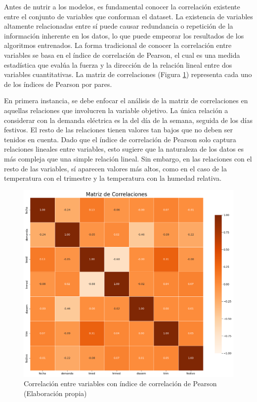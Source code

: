 \documentclass[12pt,a4paper]{report}
\begin{document}
Antes de nutrir a los modelos, es fundamental conocer la correlación existente entre el conjunto de variables que conforman el dataset. La existencia de variables altamente relacionadas entre sí puede causar redundancia o repetición de la información inherente en los datos, lo que puede empeorar los resultados de los algoritmos entrenados. La forma tradicional de conocer la correlación entre variables se basa en el índice de correlación de Pearson, el cual es una medida estadística que evalúa la fuerza y la dirección de la relación lineal entre dos variables cuantitativas. La matriz de correlaciones (Figura \ref{fig:mat_corr}) representa cada uno de los índices de Pearson por pares.

En primera instancia, se debe enfocar el análisis de la matriz de correlaciones en aquellas relaciones que involucren la variable objetivo. La única relación a considerar con la demanda eléctrica es la del día de la semana, seguida de los días festivos. El resto de las relaciones tienen valores tan bajos que no deben ser tenidos en cuenta. Dado que el índice de correlación de Pearson solo captura relaciones lineales entre variables, esto sugiere que la naturaleza de los datos es más compleja que una simple relación lineal. Sin embargo, en las relaciones con el resto de las variables, sí aparecen valores más altos, como en el caso de la temperatura con el trimestre y la temperatura con la humedad relativa.

\begin{figure}[H]
    \centering
    \includegraphics[width=1\textwidth]{Images/tfm-3.3.png}
    \caption{Correlación entre variables con índice de correlación de Pearson (Elaboración propia)}
    \label{fig:mat_corr}
\end{figure}
\end{document}
